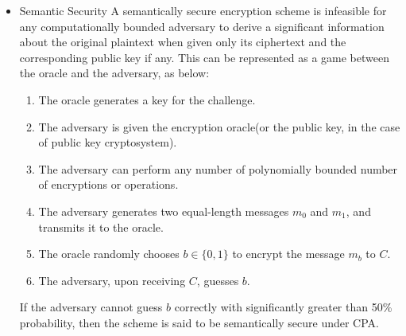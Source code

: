 \documentclass{report}
\begin{document}
		\begin{itemize}
			\item Semantic Security
			\subitem A semantically secure encryption scheme is infeasible for any computationally bounded adversary to derive a significant information about the original plaintext when given only its ciphertext and the corresponding public key if any. This can be represented as a game between the oracle and the adversary, as below:
			\begin{enumerate}
				\item The oracle generates a key for the challenge.
				\item The adversary is given the encryption oracle(or the public key, in the case of public key cryptosystem).
				\item The adversary can perform any number of polynomially bounded number of encryptions or operations.
				\item The adversary generates two equal-length messages $m_0$ and $m_1$, and transmits it to the oracle.
				\item The oracle randomly chooses $b \in \{0,1\}$ to encrypt the message $m_b$ to $C$.
				\item The adversary, upon receiving $C$, guesses $b$.
			\end{enumerate}
			If the adversary cannot guess $b$ correctly with significantly greater than 50\% probability, then the scheme is said to be semantically secure under CPA.
			

\end{itemize}
\end{document}
